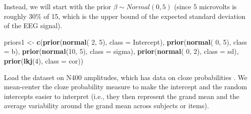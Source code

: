 \documentclass[12pt,]{krantz}
\newenvironment{Shaded}{\begin{snugshade}}{\end{snugshade}}
\newcommand{\KeywordTok}[1]{\textcolor[rgb]{0.13,0.29,0.53}{\textbf{#1}}}
\newcommand{\DataTypeTok}[1]{\textcolor[rgb]{0.13,0.29,0.53}{#1}}
\newcommand{\DecValTok}[1]{\textcolor[rgb]{0.00,0.00,0.81}{#1}}
\newcommand{\StringTok}[1]{\textcolor[rgb]{0.31,0.60,0.02}{#1}}
\newcommand{\OperatorTok}[1]{\textcolor[rgb]{0.81,0.36,0.00}{\textbf{#1}}}
\newcommand{\NormalTok}[1]{#1}
\theoremstyle{definition}
\theoremstyle{definition}
\theoremstyle{definition}
\theoremstyle{remark}
\begin{document}
Instead, we will start with the prior \(\beta \sim Normal(0,5)\) (since
5 microvolts is roughly 30\% of 15, which is the upper bound of the
expected standard deviation of the EEG signal).

\begin{Shaded}
\begin{Highlighting}[]
\NormalTok{priors1 <-}\StringTok{ }\KeywordTok{c}\NormalTok{(}\KeywordTok{prior}\NormalTok{(}\KeywordTok{normal}\NormalTok{( }\DecValTok{2}\NormalTok{, }\DecValTok{5}\NormalTok{), }\DataTypeTok{class =}\NormalTok{ Intercept),}
             \KeywordTok{prior}\NormalTok{(}\KeywordTok{normal}\NormalTok{( }\DecValTok{0}\NormalTok{, }\DecValTok{5}\NormalTok{), }\DataTypeTok{class =}\NormalTok{ b),}
             \KeywordTok{prior}\NormalTok{(}\KeywordTok{normal}\NormalTok{(}\DecValTok{10}\NormalTok{, }\DecValTok{5}\NormalTok{), }\DataTypeTok{class =}\NormalTok{ sigma),}
             \KeywordTok{prior}\NormalTok{(}\KeywordTok{normal}\NormalTok{( }\DecValTok{0}\NormalTok{, }\DecValTok{2}\NormalTok{), }\DataTypeTok{class =}\NormalTok{ sd),}
             \KeywordTok{prior}\NormalTok{(}\KeywordTok{lkj}\NormalTok{(}\DecValTok{4}\NormalTok{), }\DataTypeTok{class =}\NormalTok{ cor))}
\end{Highlighting}
\end{Shaded}

Load the dataset on N400 amplitudes, which has data on cloze
probabilities \citep{nieuwlandLargescaleReplicationStudy2018}. We
mean-center the cloze probability measure to make the intercept and the
random intercepts easier to interpret (i.e., they then represent the
grand mean and the average variability around the grand mean across
subjects or items).

\begin{Shaded}
\end{Shaded}
\end{document}
